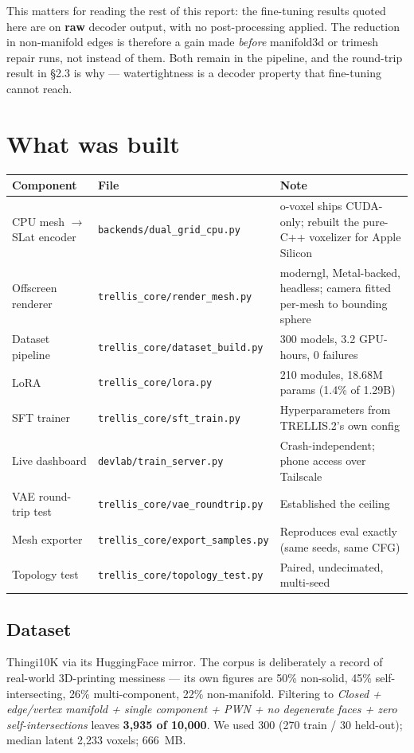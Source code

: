 \documentclass[11pt,a4paper]{article}
\begin{document}
This matters for reading the rest of this report: the fine-tuning results quoted here are on
\textbf{raw} decoder output, with no post-processing applied. The reduction in non-manifold edges is
therefore a gain made \textit{before} manifold3d or trimesh repair runs, not instead of them. Both remain
in the pipeline, and the round-trip result in \S{}2.3 is why --- watertightness is a decoder property
that fine-tuning cannot reach.

\section{What was built}
\begin{center}\small
\begin{tabular}{@{}lll@{}}
\toprule
\textbf{Component} & \textbf{File} & \textbf{Note} \\
\midrule
CPU mesh $\rightarrow$ SLat encoder & \texttt{backends/dual\_grid\_cpu.py} & o-voxel ships CUDA-only; rebuilt the pure-C++ voxelizer for Apple Silicon \\
Offscreen renderer & \texttt{trellis\_core/render\_mesh.py} & moderngl, Metal-backed, headless; camera fitted per-mesh to bounding sphere \\
Dataset pipeline & \texttt{trellis\_core/dataset\_build.py} & 300 models, 3.2 GPU-hours, 0 failures \\
LoRA & \texttt{trellis\_core/lora.py} & 210 modules, 18.68M params (1.4\% of 1.29B) \\
SFT trainer & \texttt{trellis\_core/sft\_train.py} & Hyperparameters from TRELLIS.2's own config \\
Live dashboard & \texttt{devlab/train\_server.py} & Crash-independent; phone access over Tailscale \\
VAE round-trip test & \texttt{trellis\_core/vae\_roundtrip.py} & Established the ceiling \\
Mesh exporter & \texttt{trellis\_core/export\_samples.py} & Reproduces eval exactly (same seeds, same CFG) \\
Topology test & \texttt{trellis\_core/topology\_test.py} & Paired, undecimated, multi-seed \\
\bottomrule
\end{tabular}
\end{center}
\subsection{Dataset}
Thingi10K via its HuggingFace mirror. The corpus is deliberately a record of real-world
3D-printing messiness --- its own figures are 50\% non-solid, 45\% self-intersecting, 26\%
multi-component, 22\% non-manifold. Filtering to \textit{Closed + edge/vertex manifold + single component +
PWN + no degenerate faces + zero self-intersections} leaves \textbf{3,935 of 10,000}. We used 300
(270 train / 30 held-out); median latent 2,233 voxels; 666~MB.
\end{document}
